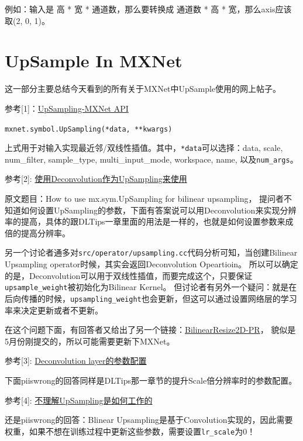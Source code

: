 例如：输入是 高 * 宽 * 通道数，那么要转换成 通道数 * 高 * 宽，那么axis应该取(2, 0, 1)。

\section{UpSample In MXNet}

这一部分主要总结今天看到的所有关于MXNet中UpSample使用的网上帖子。

参考[1]：\href{https://mxnet.incubator.apache.org/api/python/symbol/symbol.html?highlight=upsampling#mxnet.symbol.UpSampling}{UpSampling-MXNet API}

\verb|mxnet.symbol.UpSampling(*data, **kwargs)|

上式用于对输入实现最近邻/双线性插值。其中，\verb|*data|可以选择：data, scale, num\_filter, sample\_type, multi\_input\_mode, workspace, name, 以及\verb|num_args|。

参考[2]: \href{https://github.com/apache/incubator-mxnet/issues/4134}{使用Deconvolution作为UpSampling来使用}

原文题目：How to use mx.sym.UpSampling for bilinear upsampling， 提问者不知道如何设置UpSampling的参数，下面有答案说可以用Deconvolution来实现分辨率的提高，具体的跟DLTips一章里面的用法是一样的，也就是如何设置参数来成倍的提高分辨率。

另一个讨论者通多对\verb|src/operator/upsampling.cc|代码分析可知，当创建Bilinear Upsampling operator时候，其实会返回Deconvolution Opeartioin。 所以可以确定的是，Deconvolution可以用于双线性插值，而要完成这个，只要保证\verb|upsample_weight|被初始化为Bilinear Kernel。 但讨论者有另外一个疑问：就是在后向传播的时候，\verb|upsampling_weight|也会更新，但这可以通过设置网络层的学习率来决定更新或者不更新。

在这个问题下面，有回答者又给出了另一个链接：\href{https://github.com/apache/incubator-mxnet/pull/9688}{BilinearResize2D-PR}， 貌似是5月份刚提交的，所以可能需要更新下MXNet。

参考[3]: \href{https://github.com/apache/incubator-mxnet/issues/1514}{Deconvolution layer的参数配置}

下面piiswrong的回答同样是DLTips那一章节的提升Scale倍分辨率时的参数配置。

参考[4]: \href{https://github.com/apache/incubator-mxnet/issues/1412}{不理解UpSampling是如何工作的}

还是piiswrong的回答：Blinear Upsampling是基于Convolution实现的，因此需要权重，如果不想在训练过程中更新这些参数，需要设置\verb|lr_scale|为0！

